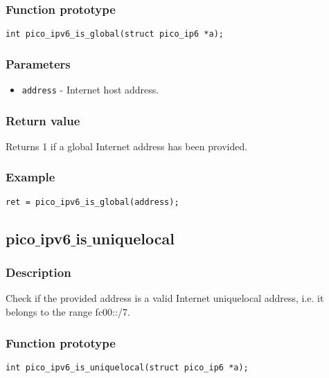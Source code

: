 \subsubsection*{Function prototype}
\begin{verbatim}
int pico_ipv6_is_global(struct pico_ip6 *a);
\end{verbatim}

\subsubsection*{Parameters}
\begin{itemize}[noitemsep]
\item \texttt{address} - Internet host address.
\end{itemize}

\subsubsection*{Return value}
Returns 1 if a global Internet address has been provided.


\subsubsection*{Example}
\begin{verbatim}
ret = pico_ipv6_is_global(address);
\end{verbatim}

\subsection{pico$\_$ipv6$\_$is$\_$uniquelocal}

\subsubsection*{Description}
Check if the provided address is a valid Internet uniquelocal address, i.e. it belongs to the range fc00::/7.

\subsubsection*{Function prototype}
\begin{verbatim}
int pico_ipv6_is_uniquelocal(struct pico_ip6 *a);
\end{verbatim}

